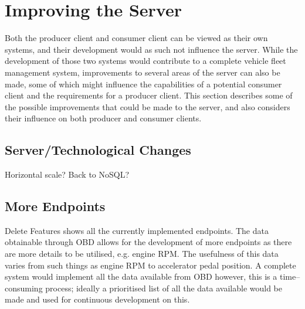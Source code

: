 \section{Improving the Server}\label{sec:fw_server}
Both the producer client and consumer client can be viewed as their own systems, and their development would as such not influence the server.
While the development of those two systems would contribute to a complete vehicle fleet management system, improvements to several areas of the server can also be made, some of which might influence the capabilities of a potential consumer client and the requirements for a producer client.
This section describes some of the possible improvements that could be made to the server, and also considers their influence on both producer and consumer clients.
\subsection{Server/Technological Changes}
Horizontal scale?
Back to NoSQL?
\subsection{More Endpoints}
Delete Features
 shows all the currently implemented endpoints.
The data obtainable through \ac{OBD} allows for the development of more endpoints as there are more details to be utilised, e.g. engine RPM.
The usefulness of this data varies from such things as engine RPM to accelerator pedal position.
A complete system would implement all the data available from \ac{OBD} however, this is a time--consuming process; ideally a prioritised list of all the data available would be made and used for continuous development on this.
